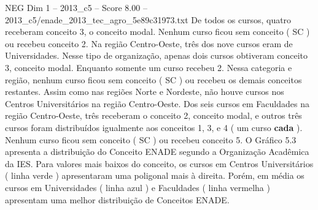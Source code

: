 \begin{textsample}{NEG Dim 1 – 2013\_c5 – Score 8.00 – 2013\_c5/enade\_2013\_tec\_agro\_5e89c31973.txt}
De todos os cursos, quatro receberam conceito 3, o conceito modal.
Nenhum curso ficou sem conceito ( SC ) ou recebeu conceito 2.
Na região Centro-Oeste, três dos nove cursos eram de Universidades.
Nesse tipo de organização, apenas dois cursos obtiveram conceito 3, conceito modal.
Enquanto somente um curso recebeu 2.
Nessa categoria e região, nenhum curso ficou sem conceito ( SC ) ou recebeu os demais conceitos restantes.
Assim como nas regiões Norte e Nordeste, não houve cursos nos Centros Universitários na região Centro-Oeste.
Dos seis cursos em Faculdades na região Centro-Oeste, três receberam o conceito 2, conceito modal, e outros três cursos foram distribuídos igualmente aos conceitos 1, 3, e 4 ( um curso \textbf{cada} ).
Nenhum curso ficou sem conceito ( SC ) ou recebeu conceito 5.
O Gráfico 5.3 apresenta a distribuição do Conceito ENADE segundo a Organização Acadêmica da IES.
Para valores mais baixos do conceito, os cursos em Centros Universitários ( linha verde ) apresentaram uma poligonal mais à direita.
Porém, em média os cursos em Universidades ( linha azul ) e Faculdades ( linha vermelha ) apresentam uma melhor distribuição de Conceitos ENADE.

\end{textsample}
